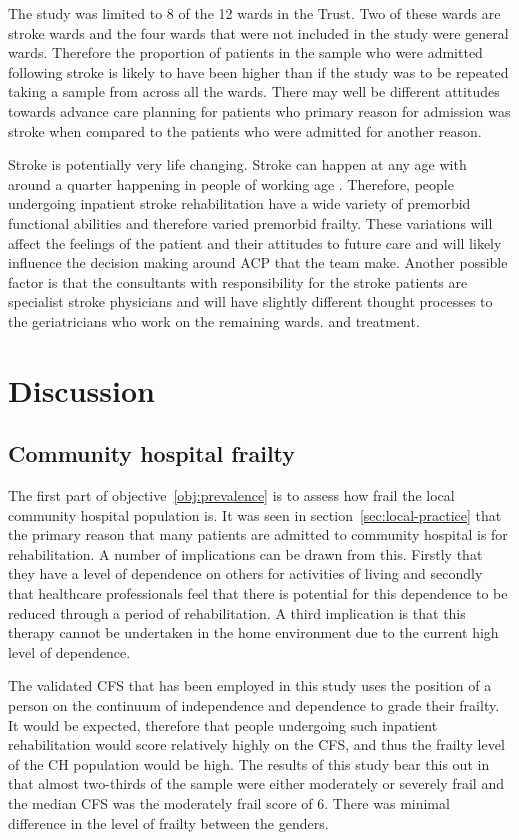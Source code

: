\documentclass
[
	12pt,
	a4paper,
	oneside,
]{report}
\begin{document}
The study was limited to 8 of the 12 wards in the Trust. Two of these wards
are stroke wards and the four wards that were not included in the study were 
general wards. Therefore the proportion of patients in the sample
who were admitted following stroke is likely to have been higher than if the 
study was to be repeated taking a sample from across all the wards. There may 
well be different attitudes towards advance care planning for patients who 
primary reason for admission was stroke when compared to the patients who
were admitted for another reason.

Stroke is potentially very life changing. Stroke can happen at any age with 
around a quarter happening in people of working age \parencite{stroke:18}. 
Therefore, people undergoing 
inpatient stroke rehabilitation have a wide variety of premorbid functional 
abilities and therefore varied premorbid frailty. These variations will
affect the feelings of the patient and their attitudes to future care and will
likely influence the decision making around ACP that the team make. Another
possible factor is that the consultants with responsibility for the stroke 
patients are specialist stroke physicians and will have slightly different 
thought processes to the geriatricians who work on the remaining wards.
and treatment.


\chapter{Discussion}

\section{Community hospital frailty}

The first part of objective~\ref{obj:prevalence} is to assess how frail the
local community hospital population is. It was seen in 
section~\ref{sec:local-practice} that the primary reason that many patients are
admitted to community hospital is for rehabilitation. A number of implications 
can be 
drawn from this. Firstly that they have a level of dependence on others for 
activities 
of living and secondly that healthcare professionals feel that there is 
potential for this dependence to be reduced through a period of rehabilitation. A 
third implication is that this therapy cannot be undertaken in the home
environment due to the current high level of dependence.

The validated CFS that has been employed in this study uses the position of a person
on the continuum of independence and dependence to grade their frailty. It
would be expected, therefore that people undergoing such inpatient rehabilitation 
would score relatively highly on the CFS, and thus the frailty level of the 
CH population would be high. The results of this study bear this out in that
almost two-thirds of the sample were either moderately or severely frail
and the median CFS was the moderately frail score of 6. There was minimal
difference in the level of frailty between the genders.
\end{document}
